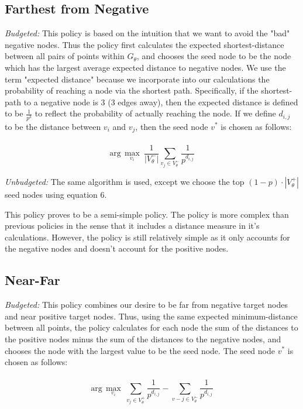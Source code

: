 \subsection{Farthest from Negative}
\textit{Budgeted:}
This policy is based on the intuition that we want to avoid the "bad" negative nodes. Thus the policy first calculates the expected shortest-distance between all pairs of points within $G_\theta$, and chooses the seed node to be the node which has the largest average expected distance to negative nodes. We use the term "expected distance" because we incorporate into our calculations the probability of reaching a node via the shortest path. Specifically, if the shortest-path to a negative node is 3 (3 edges away), then the expected distance is defined to be $\frac{1}{p^3}$ to reflect the probability of actually reaching the node. If we define $d_{i,j}$ to be the distance between $v_i$ and $v_j$, then the seed node $v^*$ is chosen as follows:
\\ \\
\begin{equation}
\text{arg}\,\max\limits_{v_i}\  \frac{1}{|V_{\theta}^-|} \sum_{v_j \in V_\theta^-} \frac{1}{p^{d_{i,j}}}
\end{equation}

\textit{Unbudgeted:}
The same algorithm is used, except we choose the top $(1-p) \cdot |V_\theta^+|$ seed nodes using equation 6.

This policy proves to be a semi-simple policy. The policy is more complex than previous policies in the sense that it includes a distance measure in it's calculations. However, the policy is still relatively simple as it only accounts for the negative nodes and doesn't account for the positive nodes.

\subsection{Near-Far} 
\textit{Budgeted:}
This policy combines our desire to be far from negative target nodes and near positive target nodes. Thus, using the same expected minimum-distance between all points, the policy calculates for each node the sum of the distances to the positive nodes minus the sum of the distances to the negative nodes, and chooses the node with the largest value to be the seed node. The seed node $v^*$ is chosen as follows:
\\ \\
\begin{equation}
\text{arg}\,\max\limits_{v_i}\  \sum_{v_j \in V_\theta^+} \frac{1}{p^{d_{i,j}}} -  \sum_{v-j \in V_{\theta}^-} \frac{1}{p^{d_{i,j}}}
\end{equation}

